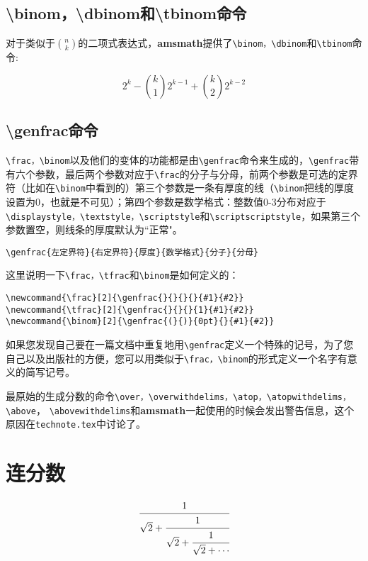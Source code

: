 \documentclass[openany]{ctexbook}
\begin{document}
\subsection{\textbackslash binom，\textbackslash dbinom和\textbackslash tbinom命令}
对于类似于$\binom nk$的二项式表达式，{\bfseries amsmath}提供了\verb|\binom，\dbinom|和\verb|\tbinom|命令:
\begin{tcblisting}{}
\begin{equation}
2^k-\binom{k}{1}2^{k-1}+\binom{k}{2}2^{k-2}
\end{equation}
\end{tcblisting}

\subsection{\textbackslash genfrac命令}
\verb|\frac，\binom|以及他们的变体的功能都是由\verb|\genfrac|命令来生成的，\verb|\genfrac|带有六个参数，最后两个参数对应于\verb|\frac|的分子与分母，前两个参数是可选的定界符（比如在\verb|\binom|中看到的）第三个参数是一条有厚度的线（\verb|\binom|把线的厚度设置为0，也就是不可见）；第四个参数是数学格式：整数值0-3分布对应于\verb|\displaystyle，\textstyle，\scriptstyle|和\verb|\scriptscriptstyle|，如果第三个参数置空，则线条的厚度默认为``正常"。
\begin{verbatim}
\genfrac{左定界符}{右定界符}{厚度}{数学格式}{分子}{分母}
\end{verbatim}
这里说明一下\verb|\frac，\tfrac|和\verb|\binom|是如何定义的：
\begin{verbatim}
\newcommand{\frac}[2]{\genfrac{}{}{}{}{#1}{#2}}
\newcommand{\tfrac}[2]{\genfrac{}{}{}{1}{#1}{#2}}
\newcommand{\binom}[2]{\genfrac{(}{)}{0pt}{}{#1}{#2}}
\end{verbatim}
如果您发现自己要在一篇文档中重复地用\verb|\genfrac|定义一个特殊的记号，为了您自己以及出版社的方便，您可以用类似于\verb|\frac，\binom|的形式定义一个名字有意义的简写记号。

最原始的生成分数的命令\verb|\over，\overwithdelims，\atop，\atopwithdelims，\above|，
\verb|\abovewithdelims|和{\bfseries amsmath}一起使用的时候会发出警告信息，这个原因在\verb|technote.tex|中讨论了。
\section{连分数}
\begin{listing}
\begin{equation}
\cfrac{1}{\sqrt{2}+
 \cfrac{1}{\sqrt{2}+
  \cfrac{1}{\sqrt{2}+\dotsb
 }}}
\end{equation}
\end{listing}
\end{document}
